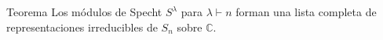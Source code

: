 \documentclass[final,xcolor=svgnames]{beamer}
\DeclareMathOperator{\sgn}{sgn}
\begin{document}
\begin{frame}{}
\begin{columns}
\begin{column}{0.5\textwidth}
        

     \begin{block}{Teorema}
         Los módulos de Specht $S^{\lambda}$ para $\lambda\vdash n$ forman
         una lista completa de representaciones irreducibles de $S_{n}$ sobre $\mathbb{C}$.
      \end{block}


\end{column}
\end{columns}
\end{frame}
\end{document}
